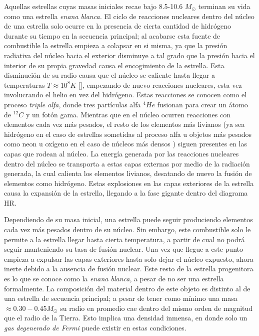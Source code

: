 Aquellas estrellas cuyas masas iniciales recae bajo 8.5-10.6 \(M_{\odot}\)
terminan su vida como una estrella \textit{enana blanca.}
\citet*{whiteDwarfsReview} El ciclo de reacciones nucleares dentro del núcleo de
una estrella solo ocurre en la presencia de cierta cantidad de hidrógeno durante
su tiempo en la secuencia principal; al acabarse esta fuente de combustible la
estrella empieza a colapsar en si misma, ya que la presión radiativa del núcleo
hacia el exterior disminuye a tal grado que la presión hacia el interior de su
propia gravedad causa el encogimiento de la estrella. Esta disminución de su
radio causa que el núcleo se caliente hasta llegar a temperaturas \(T \approx
10^{8} K\) [\citet*{astronomyPhysicalPerspective_stellarOldAgeChapter}],
empezando de nuevo reacciones nucleares, esta vez involucrando el helio en vez
del hidrógeno. Estas reacciones se conocen como el proceso \textit{triple alfa},
donde tres partículas alfa \(^{4}He\) fusionan para crear un átomo de \(^{12}C\)
y un fotón gama. Mientras que en el núcleo ocurren reacciones con elementos cada
vez más pesados, el resto de los elementos más livianos (ya sea hidrógeno en el
caso de estrellas sometidas al proceso alfa u objetos más pesados como neon u
oxígeno en el caso de núcleos más densos
\citet*{astronomyPhysicalPerspective_stellarOldAgeChapter}) siguen presentes en
las capas que rodean al núcleo. La energía generada por las reacciones nucleares
dentro del núcleo se transporta a estas capas externas por medio de la radiación
generada, la cual calienta los elementos livianos, desatando de nuevo la fusión
de elementos como hidrógeno. Estas explosiones en las capas exteriores de la
estrella causa la expansión de la estrella, llegando a la fase gigante dentro
del diagrama HR.

Dependiendo de su masa inicial, una estrella puede seguir produciendo elementos
cada vez más pesados dentro de su núcleo. Sin embargo, este combustible solo le
permite a la estrella llegar hasta cierta temperatura, a partir de cual no podrá
seguir manteniendo su tasa de fusión nuclear. Una vez que llegue a este punto
empieza a expulsar las capas exteriores hasta solo dejar el núcleo expuesto,
ahora inerte debido a la ausencia de fusión nuclear. Este resto de la estrella
progenitora es lo que se conoce como la \textit{enana blanca}, a pesar de no ser
una estrella formalmente. La composición del material dentro de este objeto es
distinto al de una estrella de secuencia principal; a pesar de tener como mínimo
una masa \(\approx 0.30-0.45 M_{\odot}\) su radio en promedio cae dentro del
mismo orden de magnitud que el radio de la Tierra. \citet*{whiteDwarfsReview}
Esto implica una densidad inmensa, en donde solo un \textit{gas degenerado de
Fermi} puede existir en estas condiciones.